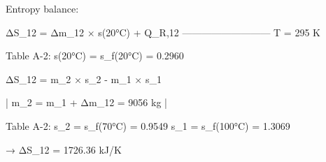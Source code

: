 Entropy balance:  

ΔS_12 = Δm_12 × s(20°C) + Q_R,12  
              ---------------------------  
                           T = 295 K  

Table A-2:  
s(20°C) = s_f(20°C) = 0.2960  

ΔS_12 = m_2 × s_2 - m_1 × s_1  

| m_2 = m_1 + Δm_12 = 9056 kg |  

Table A-2:  
s_2 = s_f(70°C) = 0.9549  
s_1 = s_f(100°C) = 1.3069  

→ ΔS_12 = 1726.36 kJ/K